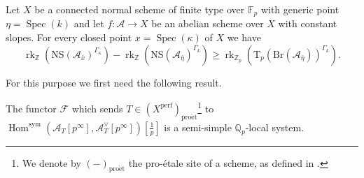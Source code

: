 \documentclass[11pt]{amsart}
\newcommand{\Fp}{\mathbb{F}_p}
\newcommand{\Z}{\mathbb{Z}}
\newcommand{\Zp}{{\mathbb{Z}_{p}}}
\newcommand{\Qp}{{\mathbb{Q}_{p}}}
\newcommand{\sym}{{\mathrm{sym}}}
\newcommand{\calA}{\mathcal{A}}
\newcommand{\calF}{\mathcal{F}}
\DeclareMathOperator{\Spec}{Spec}
\DeclareMathOperator{\Hom}{Hom}
\DeclareMathOperator{\rk}{rk}
\newcommand{\et}{\mathrm{\acute{e}t}}
\newcommand{\Br}{\mathrm{Br}}
\newcommand{\NS}{\mathrm{NS}}
\newcommand{\Tp}{\mathrm{T}_p}
\begin{document}
\begin{theo}\label{NS:t}
	Let $X$ be a connected normal scheme of finite type over $\Fp$ with generic point $\eta=\Spec(k)$ and let $f:\calA\to X$ be an abelian scheme over $X$ with constant slopes. For every closed point $x=\Spec(\kappa)$ of $X$ we have $$\rk_\Z(\NS(\calA_{\bar{x}})^{\Gamma_\kappa})-\rk_\Z(\NS(\calA_{\bar{\eta}})^{\Gamma_k})\geq \rk_\Zp ( \Tp(\Br(\calA_{\bar{\eta}}))^{\Gamma_k}).$$
\end{theo}

For this purpose we first need the following result.

\begin{prop}\label{lisse-sheaf:p}
	The functor $\calF$ which sends $T\in (X^{\mathrm{perf}})_{\mathrm{pro}\et}$\footnote{We denote by $(-)_{\mathrm{pro}\et}$ the pro-étale site of a scheme, as defined in \cite{BS15}.} to $\Hom^{\sym}(\calA_T[p^\infty],\calA^\vee_T[p^\infty])[\tfrac{1}{p}]$ is a semi-simple $\Qp$-local system.
\end{prop}
\end{document}
